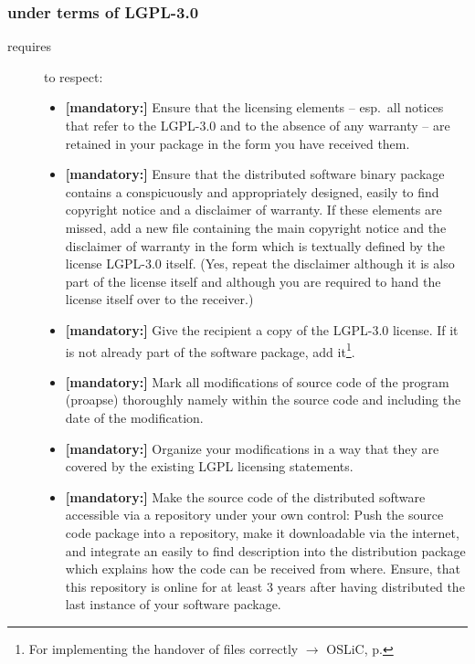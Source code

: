 \subsubsection{under terms of LGPL-3.0}
\begin{description}
\item[requires] to respect:
\begin{itemize}

  \item \textbf{[mandatory:]} Ensure that the licensing elements -- esp.\ all
  notices that refer to the LGPL-3.0 and to the absence of any
  warranty -- are retained in your package in the form you have received them.

  \item \textbf{[mandatory:]} Ensure that the distributed software binary
  package contains a conspicuously and appropriately designed, easily to find
  copyright notice and a disclaimer of warranty. If these elements are missed,
  add a new file containing the main copyright notice and the disclaimer of
  warranty in the form which is textually defined by the license LGPL-3.0
  itself. (Yes, repeat the disclaimer although it is also part of the license
  itself and although you are required to hand the license itself over to the
  receiver.)
  
  \item \textbf{[mandatory:]} Give the recipient a copy of the LGPL-3.0 license.
  If it is not already part of the software package, add it\footnote{For
  implementing the handover of files correctly $\rightarrow$ OSLiC, p.
  \pageref{DistributingFilesHint}}.

  \item \textbf{[mandatory:]} Mark all modifications of source code of the
  program (proapse) thoroughly namely within the source code and including
  the date of the modification.
  
  \item \textbf{[mandatory:]} Organize your modifications in a way that they are
  covered by the existing LGPL licensing statements.
  
  \item \textbf{[mandatory:]} Make the source code of the distributed software
  accessible via a repository under your own control: Push the source code
  package into a repository, make it downloadable via the internet, and
  integrate an easily to find description into the distribution package which
  explains how the code can be received from where. Ensure, that this repository
  is online for at least 3 years after having distributed the last instance
  of your software package.
  

\end{itemize}
\end{description}
